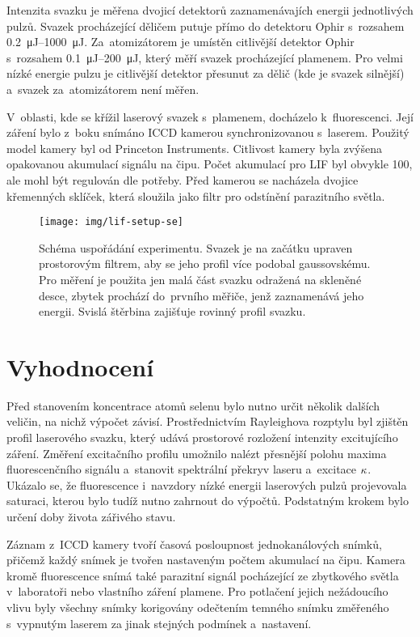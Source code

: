 Intenzita svazku je měřena dvojicí detektorů
zaznamenávajích energii jednotlivých pulzů.
Svazek procházející děličem putuje přímo do detektoru
Ophir 
s~rozsahem \SIrange{0.2}{1000}{\micro\joule}.
Za~atomizátorem je umístěn citlivější detektor
Ophir 
s~rozsahem \SIrange{0.1}{200}{\micro\joule},
který měří svazek procházející plamenem.
Pro velmi nízké energie pulzu je citlivější detektor přesunut
za dělič (kde je svazek silnější) a~svazek za~atomizátorem není měřen.

V~oblasti, kde se křížil laserový svazek s~plamenem, docházelo k~fluorescenci.
Její záření bylo z~boku snímáno ICCD kamerou synchronizovanou s~laserem.
Použitý model kamery byl  od Princeton Instruments.
Citlivost kamery byla zvýšena opakovanou akumulací signálu na čipu.
Počet akumulací pro LIF byl obvykle 100, ale mohl být regulován dle potřeby.
Před kamerou se nacházela dvojice křemenných sklíček,
která sloužila jako filtr pro odstínění parazitního světla.

\begin{figure}[htb]
	\centering
	\texttt{[image: img/lif-setup-se]}
	\caption{Schéma uspořádání experimentu.
		Svazek je na začátku upraven prostorovým filtrem,
		aby se jeho profil více podobal gaussovskému.
		Pro měření je použita jen malá část svazku odražená na skleněné desce,
		zbytek prochází do~prvního měřiče, jenž zaznamenává jeho energii.
		Svislá štěrbina zajišťuje rovinný profil svazku.}
	\label{fig:lif-setup}
\end{figure}

\section{Vyhodnocení}
\label{sec:lif-method}
Před stanovením koncentrace atomů selenu bylo nutno určit několik
dalších veličin, na nichž výpočet závisí.
Prostřednictvím Rayleighova rozptylu byl zjištěn profil laserového svazku,
který udává prostorové rozložení intenzity excitujícího záření.
Změření excitačního profilu umožnilo nalézt přesnější polohu maxima
fluorescenčního signálu
a~stanovit spektrální překryv laseru a~excitace $\kappa$.
Ukázalo se, že fluorescence i~navzdory nízké energii laserových pulzů
projevovala saturaci, kterou bylo tudíž nutno zahrnout do výpočtů.
Podstatným krokem bylo určení doby života zářivého stavu.

Záznam z~ICCD kamery tvoří časová posloupnost jednokanálových sním\-ků,
přičemž každý snímek je tvořen nastaveným počtem akumulací na čipu.
Kamera kromě fluorescence snímá také parazitní signál pocházející
ze zbytkového světla v~laboratoři nebo vlastního záření plamene.
Pro potlačení jejich nežádoucího vlivu
byly všechny snímky korigovány odečtením temného snímku změřeného
s~vypnutým laserem za jinak stejných podmínek a~nastavení.

